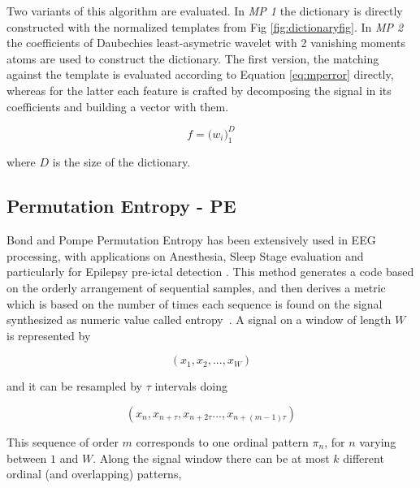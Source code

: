 \documentclass[brainsci,article,submit,moreauthors,pdftex,10pt,a4paper]{mdpi}
\begin{document}
Two variants of this algorithm are evaluated. In \textit{MP 1} the dictionary is directly constructed with the normalized templates from Fig \ref{fig:dictionaryfig}.  In \textit{MP 2} the coefficients of  Daubechies least-asymetric wavelet with 2 vanishing moments atoms are used to construct the dictionary.  The first version, the matching against the template is evaluated according to Equation \ref{eq:mperror} directly, whereas for the latter each feature is crafted by decomposing the signal in its coefficients and building a vector with them.

\begin{equation}
f =  {\bigg ( w_{i} \bigg )}_{1}^{D} 
\label{eq:multiclassificationrow}
\end{equation}

\noindent where $D$ is the size of the dictionary.




\subsection{Permutation Entropy - PE}

Bond and Pompe Permutation Entropy has been extensively used in EEG processing, with applications on Anesthesia, Sleep Stage evaluation and particularly for Epilepsy pre-ictal detection \citep{Bandt2002}.  This method generates a code based on the orderly arrangement of sequential samples, and then derives a metric which is based on the number of times each sequence is found on the signal synthesized as numeric value called entropy~\citep{Nicolaou2010}. A signal on a window of length $W$ is represented by 

\begin{equation}
(x_1,x_2,...,x_{W})
\label{eq:pesignal}
\end{equation}

and it can be resampled by $\tau$ intervals doing

\begin{equation}
(x_n,x_{n+\tau},x_{n+2 \tau}...,x_{n+(m-1)\tau})
\label{eq:pesignal}
\end{equation}

This sequence of order $m$ corresponds to one ordinal pattern $\pi_{n}$, for $n$ varying between $1$ and $W$.  Along the signal window there can be at most $k$ different ordinal (and overlapping) patterns,
\end{document}
